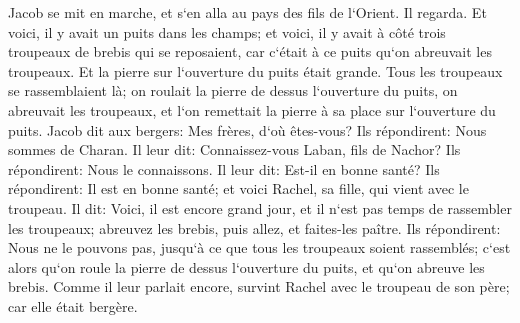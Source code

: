 \verse Jacob se mit en marche, et s`en alla au pays des fils de l`Orient. 
\verse Il regarda. Et voici, il y avait un puits dans les champs; et voici, il y avait à côté trois troupeaux de brebis qui se reposaient, car c`était à ce puits qu`on abreuvait les troupeaux. Et la pierre sur l`ouverture du puits était grande. 
\verse Tous les troupeaux se rassemblaient là; on roulait la pierre de dessus l`ouverture du puits, on abreuvait les troupeaux, et l`on remettait la pierre à sa place sur l`ouverture du puits. 
\verse Jacob dit aux bergers: Mes frères, d`où êtes-vous? Ils répondirent: Nous sommes de Charan. 
\verse Il leur dit: Connaissez-vous Laban, fils de Nachor? Ils répondirent: Nous le connaissons. 
\verse Il leur dit: Est-il en bonne santé? Ils répondirent: Il est en bonne santé; et voici Rachel, sa fille, qui vient avec le troupeau. 
\verse Il dit: Voici, il est encore grand jour, et il n`est pas temps de rassembler les troupeaux; abreuvez les brebis, puis allez, et faites-les paître. 
\verse Ils répondirent: Nous ne le pouvons pas, jusqu`à ce que tous les troupeaux soient rassemblés; c`est alors qu`on roule la pierre de dessus l`ouverture du puits, et qu`on abreuve les brebis. 
\verse Comme il leur parlait encore, survint Rachel avec le troupeau de son père; car elle était bergère. 
